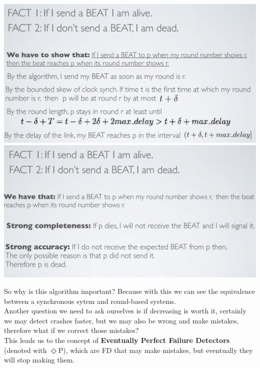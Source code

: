 \documentclass[11pt, a4paper]{article}
\begin{document}
\begin{center}
    \includegraphics[scale=0.5]{img/FD/PoRB.png}
    \includegraphics[scale=0.5]{img/FD/PoRB2.png}
\end{center}
So why is this algorithm important? Because with this we can see the equivalence between a synchronous sytem and round-based systems.\\
Another question we need to ask ourselves is if decreasing is worth it, certainly we may detect crashes faster, but we may also be wrong and make mistakes, therefore what if we correct those mistakes?\\
This leads us to the concept of \textbf{Eventually Perfect Failure Detectors} (denoted with $\Diamond$P), which are FD that may make mistakes, but eventually they will stop making them.\\
\end{document}
